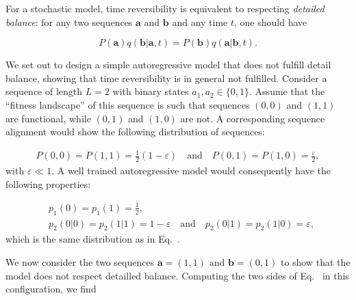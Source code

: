 For a stochastic model, time reversibility is equivalent to respecting \emph{detailed balance}: for any two sequences  $\mathbf{a}$ and  $\mathbf{b}$ and any time $t$, one should have

\begin{equation}
	\label{eq:detailed_balance_def}
	P(\mathbf{a})q(\mathbf{b}\vert \mathbf{a}, t) = P(\mathbf{b})q(\mathbf{a}\vert \mathbf{b}, t).
\end{equation}

We set out to design a simple autoregressive model that does not fulfill detail balance, showing that time reversibility is in general not fulfilled. 
Consider a sequence of length $L=2$ with binary states $a_1, a_2 \in \{0, 1\}$. 
Assume that the ``fitness landscape'' of this sequence is such that sequences $(0,0)$ and $(1,1)$ are functional, while $(0,1)$ and $(1,0)$ are not. 
A corresponding sequence alignment would show the following distribution of sequences: 

\begin{equation}
\begin{split}
	\label{eq:toy_irreversible_eq}
	P(0,0) = P(1,1) = \frac{1}{2}(1 - \varepsilon) \quad\text{and}\quad P(0,1) = P(1,0) = \frac{\varepsilon}{2},
\end{split}
\end{equation}
with $\varepsilon \ll 1$. 
A well trained autoregressive model would consequently have the following properties: 

\begin{equation}
	\begin{split}
	\label{eq:toy_irreversible_autoregressive_eq}
		&p_1(0) = p_1(1) = \frac{1}{2},\\
		&p_2(0 \vert 0) = p_2(1 \vert 1) = 1-\varepsilon \quad\text{and}\quad p_2(0 \vert 1) = p_2(1 \vert 0) = \varepsilon,
	\end{split}
\end{equation}
which is the same distribution as in Eq.~. 

We now consider the two sequences $\mathbf{a} = (1, 1)$ and $\mathbf{b} = (0, 1)$ to show that the model does not respect detailled balance. 
Computing the two sides of Eq.~ in this configuration, we find

